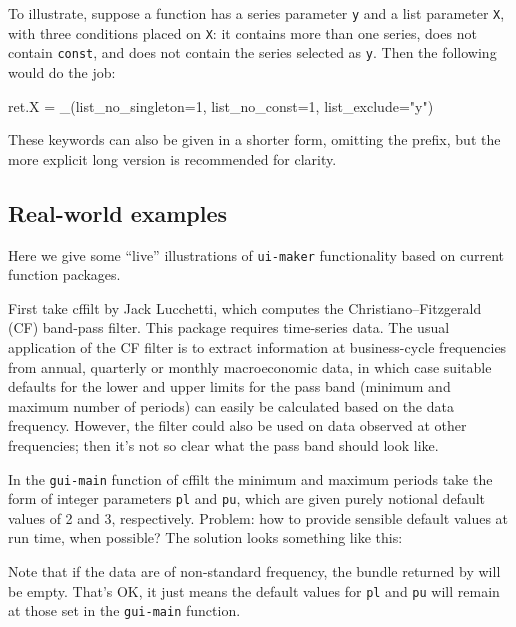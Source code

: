 \documentclass[oneside]{book}
\begin{document}
To illustrate, suppose a function has a series parameter \texttt{y}
and a list parameter \texttt{X}, with three conditions placed on
\texttt{X}: it contains more than one series, does not contain
\texttt{const}, and does not contain the series selected as
\texttt{y}. Then the following would do the job:
\begin{code}
ret.X = _(list_no_singleton=1, list_no_const=1, list_exclude="y")
\end{code}

These keywords can also be given in a shorter form, omitting the
 prefix, but the more explicit long version is
recommended for clarity.

\subsection{Real-world examples}

Here we give some ``live'' illustrations of \texttt{ui-maker}
functionality based on current function packages.

First take \textsf{cffilt} by Jack Lucchetti, which computes the
Christiano--Fitzgerald (CF) band-pass filter. This package requires
time-series data. The usual application of the CF filter is to extract
information at business-cycle frequencies from annual, quarterly or
monthly macroeconomic data, in which case suitable defaults for the
lower and upper limits for the pass band (minimum and maximum number
of periods) can easily be calculated based on the data
frequency. However, the filter could also be used on data observed at
other frequencies; then it's not so clear what the pass band should
look like.

In the \texttt{gui-main} function of \textsf{cffilt} the minimum and
maximum periods take the form of integer parameters \texttt{pl} and
\texttt{pu}, which are given purely notional default values of 2 and
3, respectively. Problem: how to provide sensible default values at
run time, when possible? The solution looks something like this:


Note that if the data are of non-standard frequency, the bundle
returned by  will be empty. That's OK, it just
means the default values for \texttt{pl} and \texttt{pu} will remain
at those set in the \texttt{gui-main} function.
\end{document}
